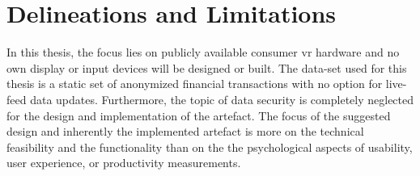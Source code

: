 \section{Delineations and Limitations}

In this thesis, the focus lies on publicly available consumer \gls{vr} hardware and no own display or input devices will be designed or built. The data-set used for this thesis is a static set of anonymized financial transactions with no option for live-feed data updates. Furthermore, the topic of data security is completely neglected for the design and implementation of the artefact. The focus of the suggested design and inherently the implemented artefact is more on the technical feasibility and the functionality than on the the psychological aspects of usability, user experience, or productivity measurements. 














